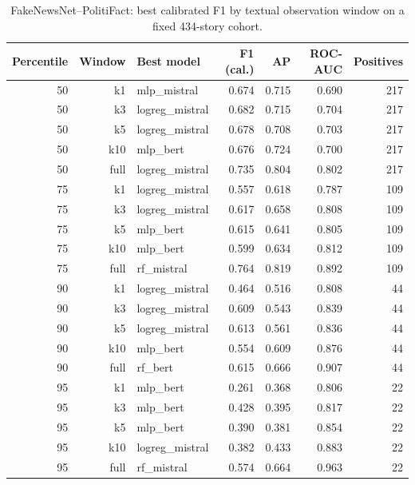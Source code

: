 \begin{table}[ht]
\centering
\small
\caption{FakeNewsNet--PolitiFact: best calibrated F1 by textual observation window on a fixed 434-story cohort.}
\label{tab:fnn-revised}
\begin{tabular}{rrlrrrr}
\toprule
Percentile & Window & Best model & F1 (cal.) & AP & ROC-AUC & Positives \\
\midrule
50 & k1 & mlp\_mistral & 0.674 & 0.715 & 0.690 & 217 \\
50 & k3 & logreg\_mistral & 0.682 & 0.715 & 0.704 & 217 \\
50 & k5 & logreg\_mistral & 0.678 & 0.708 & 0.703 & 217 \\
50 & k10 & mlp\_bert & 0.676 & 0.724 & 0.700 & 217 \\
50 & full & logreg\_mistral & 0.735 & 0.804 & 0.802 & 217 \\
75 & k1 & logreg\_mistral & 0.557 & 0.618 & 0.787 & 109 \\
75 & k3 & logreg\_mistral & 0.617 & 0.658 & 0.808 & 109 \\
75 & k5 & mlp\_bert & 0.615 & 0.641 & 0.805 & 109 \\
75 & k10 & mlp\_bert & 0.599 & 0.634 & 0.812 & 109 \\
75 & full & rf\_mistral & 0.764 & 0.819 & 0.892 & 109 \\
90 & k1 & logreg\_mistral & 0.464 & 0.516 & 0.808 & 44 \\
90 & k3 & logreg\_mistral & 0.609 & 0.543 & 0.839 & 44 \\
90 & k5 & logreg\_mistral & 0.613 & 0.561 & 0.836 & 44 \\
90 & k10 & mlp\_bert & 0.554 & 0.609 & 0.876 & 44 \\
90 & full & rf\_bert & 0.615 & 0.666 & 0.907 & 44 \\
95 & k1 & mlp\_bert & 0.261 & 0.368 & 0.806 & 22 \\
95 & k3 & mlp\_bert & 0.428 & 0.395 & 0.817 & 22 \\
95 & k5 & mlp\_bert & 0.390 & 0.381 & 0.854 & 22 \\
95 & k10 & logreg\_mistral & 0.382 & 0.433 & 0.883 & 22 \\
95 & full & rf\_mistral & 0.574 & 0.664 & 0.963 & 22 \\
\bottomrule
\end{tabular}
\end{table}
